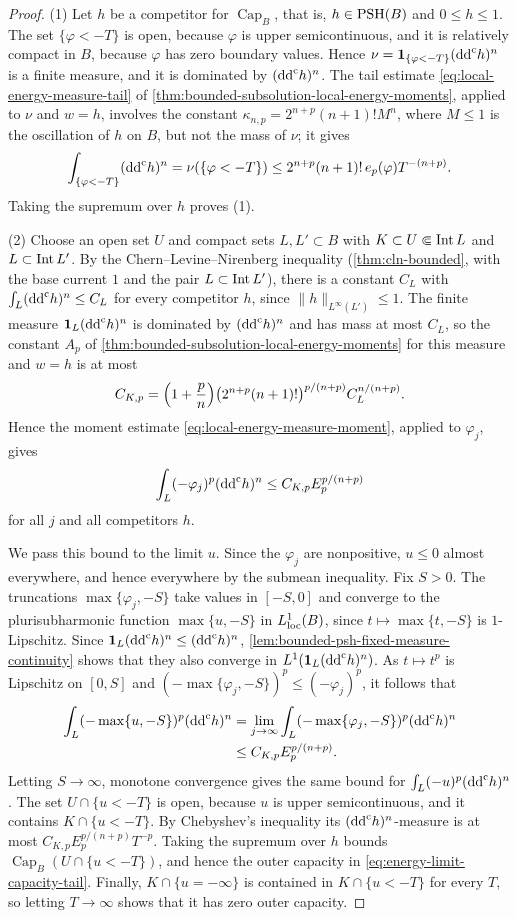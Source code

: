 \begin{proof}
(1) Let $h$ be a competitor for $\operatorname{Cap}_B$, that is, $h\in\mathrm{PSH}(B)$ and $0\leq h\leq1$. The set $\{\varphi<-T\}$ is open, because $\varphi$ is upper semicontinuous, and it is relatively compact in $B$, because $\varphi$ has zero boundary values. Hence $\nu=\mathbf1_{\{\varphi<-T\}}(\mathrm{dd}^{\mathrm{c}} h)^n$ is a finite measure, and it is dominated by $(\mathrm{dd}^{\mathrm{c}} h)^n$. The tail estimate \eqref{eq:local-energy-measure-tail} of \cref{thm:bounded-subsolution-local-energy-moments}, applied to $\nu$ and $w=h$, involves the constant $\kappa_{n,p}=2^{n+p}(n+1)!M^n$, where $M\leq1$ is the oscillation of $h$ on $B$, but not the mass of $\nu$; it gives
\[
 \int_{\{\varphi<-T\}}(\mathrm{dd}^{\mathrm{c}} h)^n=\nu(\{\varphi<-T\})
 \leq2^{n+p}(n+1)!\,e_p(\varphi)T^{-(n+p)}.
\]
Taking the supremum over $h$ proves (1).

(2) Choose an open set $U$ and compact sets $L,L'\subset B$ with $K\subset U\Subset\operatorname{Int} L$ and $L\subset\operatorname{Int} L'$. By the Chern--Levine--Nirenberg inequality (\cref{thm:cln-bounded}, with the base current $1$ and the pair $L\subset\operatorname{Int} L'$), there is a constant $C_L$ with $\int_L(\mathrm{dd}^{\mathrm{c}} h)^n\leq C_L$ for every competitor $h$, since $\|h\|_{L^\infty(L')}\leq1$. The finite measure $\mathbf1_L(\mathrm{dd}^{\mathrm{c}} h)^n$ is dominated by $(\mathrm{dd}^{\mathrm{c}} h)^n$ and has mass at most $C_L$, so the constant $A_p$ of \cref{thm:bounded-subsolution-local-energy-moments} for this measure and $w=h$ is at most
\[
 C_{K,p}=\Bigl(1+\frac pn\Bigr)\bigl(2^{n+p}(n+1)!\bigr)^{p/(n+p)}C_L^{n/(n+p)}.
\]
Hence the moment estimate \eqref{eq:local-energy-measure-moment}, applied to $\varphi_j$, gives
\[
 \int_L(-\varphi_j)^p(\mathrm{dd}^{\mathrm{c}} h)^n
                         \leq C_{K,p}E_p^{p/(n+p)}
\]
for all $j$ and all competitors $h$.

We pass this bound to the limit $u$. Since the $\varphi_j$ are nonpositive, $u\leq0$ almost everywhere, and hence everywhere by the submean inequality. Fix $S>0$. The truncations $\max\{\varphi_j,-S\}$ take values in $[-S,0]$ and converge to the plurisubharmonic function $\max\{u,-S\}$ in $L^1_{\mathrm{loc}}(B)$, since $t\mapsto\max\{t,-S\}$ is $1$-Lipschitz. Since $\mathbf1_L(\mathrm{dd}^{\mathrm{c}} h)^n\leq(\mathrm{dd}^{\mathrm{c}} h)^n$, \cref{lem:bounded-psh-fixed-measure-continuity} shows that they also converge in $L^1(\mathbf1_L(\mathrm{dd}^{\mathrm{c}} h)^n)$. As $t\mapsto t^p$ is Lipschitz on $[0,S]$ and $(-\max\{\varphi_j,-S\})^p\leq(-\varphi_j)^p$, it follows that
\[
 \begin{aligned}
 \int_L(-\max\{u,-S\})^p(\mathrm{dd}^{\mathrm{c}} h)^n
 &=\lim_{j\to\infty}\int_L(-\max\{\varphi_j,-S\})^p(\mathrm{dd}^{\mathrm{c}} h)^n\\
 &\leq C_{K,p}E_p^{p/(n+p)}.
 \end{aligned}
\]
Letting $S\to\infty$, monotone convergence gives the same bound for $\int_L(-u)^p(\mathrm{dd}^{\mathrm{c}} h)^n$. The set $U\cap\{u<-T\}$ is open, because $u$ is upper semicontinuous, and it contains $K\cap\{u<-T\}$. By Chebyshev's inequality its $(\mathrm{dd}^{\mathrm{c}} h)^n$-measure is at most $C_{K,p}E_p^{p/(n+p)}T^{-p}$. Taking the supremum over $h$ bounds $\operatorname{Cap}_B(U\cap\{u<-T\})$, and hence the outer capacity in \eqref{eq:energy-limit-capacity-tail}. Finally, $K\cap\{u=-\infty\}$ is contained in $K\cap\{u<-T\}$ for every $T$, so letting $T\to\infty$ shows that it has zero outer capacity.
\end{proof}
